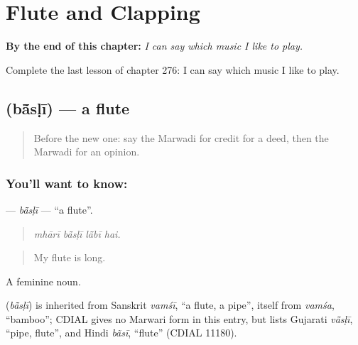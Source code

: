 
\chapter{Flute and Clapping}
\label{ch:mw-flute-and-clapping}

\begin{chapteropening}
\textbf{By the end of this chapter:} \emph{I can say which music I like to play.}

Complete the last lesson of chapter 276: I can say which music I like to play.
\end{chapteropening}

\section[\texorpdfstring{\mw{बांसळी} (bā̃sḷī)}{बांसळी (bā̃sḷī)}]{ (bā̃sḷī) — a flute}

\label{lesson:MW-C276-basli}



\begin{quote}
Before the new one: say the Marwadi for credit for a deed, then the Marwadi for an opinion.
\end{quote}

\subsection*{You'll want to know: }
\textbf{} — \emph{bā̃sḷī} — \textquotedblleft{}a flute\textquotedblright{}.

\begin{quote}
   
\end{quote}

\begin{quote}
\emph{mhārī bā̃sḷī lā̃bī hai.}
\end{quote}

\begin{quote}
My flute is long.
\end{quote}

A feminine noun.

\begin{cousinweb}
\textbf{} (\emph{bā̃sḷī}) is inherited from Sanskrit \emph{vamśī}, \textquotedblleft{}a flute, a pipe\textquotedblright{}, itself from \emph{vamśa}, \textquotedblleft{}bamboo\textquotedblright{}; CDIAL gives no Marwari form in this entry, but lists Gujarati \emph{vā̃sḷī}, \textquotedblleft{}pipe, flute\textquotedblright{}, and Hindi \emph{bãsī}, \textquotedblleft{}flute\textquotedblright{} (CDIAL 11180).
\end{cousinweb}

